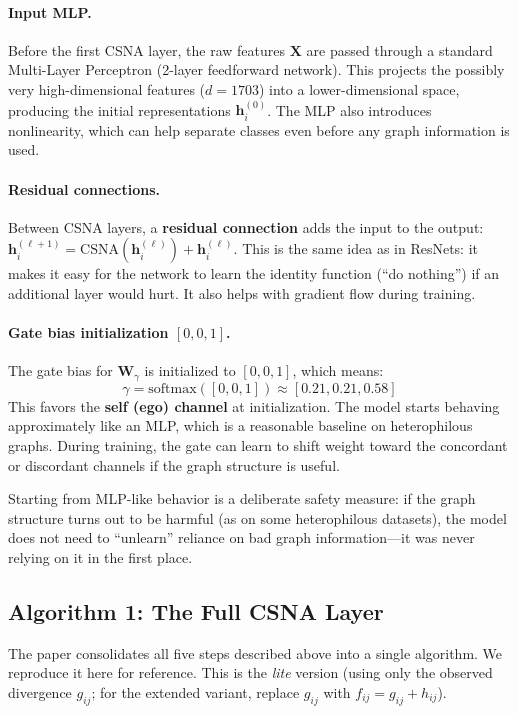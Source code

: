 \documentclass[11pt,a4paper]{article}
\newcommand{\bW}{\mathbf{W}}
\newcommand{\bh}{\mathbf{h}}
\theoremstyle{definition}
\theoremstyle{plain}
\begin{document}
\paragraph{Input MLP.}
Before the first CSNA layer, the raw features $\mathbf{X}$ are passed through a
standard Multi-Layer Perceptron (2-layer feedforward network).
This projects the possibly very high-dimensional features ($d = 1703$) into a
lower-dimensional space, producing the initial representations $\bh_i^{(0)}$.
The MLP also introduces nonlinearity, which can help separate classes even before
any graph information is used.

\paragraph{Residual connections.}
Between CSNA layers, a \textbf{residual connection} adds the input to the output:
$\bh_i^{(\ell+1)} = \text{CSNA}(\bh_i^{(\ell)}) + \bh_i^{(\ell)}$.
This is the same idea as in ResNets: it makes it easy for the network to learn
the identity function (``do nothing'') if an additional layer would hurt.
It also helps with gradient flow during training.

\paragraph{Gate bias initialization $[0, 0, 1]$.}
The gate bias for $\bW_\gamma$ is initialized to $[0, 0, 1]$, which means:
\[
  \gamma = \mathrm{softmax}([0, 0, 1]) \approx [0.21, 0.21, 0.58]
\]
This favors the \textbf{self (ego) channel} at initialization.
The model starts behaving approximately like an MLP, which is a reasonable
baseline on heterophilous graphs.
During training, the gate can learn to shift weight toward the concordant or
discordant channels if the graph structure is useful.

Starting from MLP-like behavior is a deliberate safety measure: if the graph
structure turns out to be harmful (as on some heterophilous datasets), the model
does not need to ``unlearn'' reliance on bad graph information---it was never
relying on it in the first place.


\subsection{Algorithm 1: The Full CSNA Layer}
\label{sec:algorithm}

The paper consolidates all five steps described above into a single algorithm.
We reproduce it here for reference.
This is the \emph{lite} version (using only the observed divergence $g_{ij}$;
for the extended variant, replace $g_{ij}$ with $f_{ij} = g_{ij} + h_{ij}$).
\end{document}
